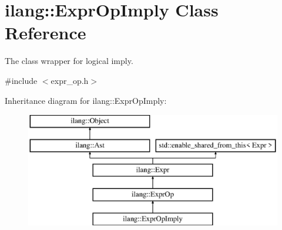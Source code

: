 \hypertarget{classilang_1_1_expr_op_imply}{}\section{ilang\+:\+:Expr\+Op\+Imply Class Reference}
\label{classilang_1_1_expr_op_imply}


The class wrapper for logical imply.  




{\ttfamily \#include $<$expr\+\_\+op.\+h$>$}

Inheritance diagram for ilang\+:\+:Expr\+Op\+Imply\+:\begin{figure}[H]
\begin{center}
\leavevmode
\includegraphics[height=5.000000cm]{classilang_1_1_expr_op_imply}
\end{center}
\end{figure}
